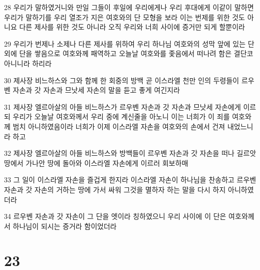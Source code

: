 \par 28 우리가 말하였거니와 만일 그들이 후일에 우리에게나 우리 후대에게 이같이 말하면 우리가 말하기를 우리 열조가 지은 여호와의 단 모형을 보라 이는 번제를 위한 것도 아니요 다른 제사를 위한 것도 아니라 오직 우리와 너희 사이에 증거만 되게 할뿐이라
\par 29 우리가 번제나 소제나 다른 제사를 위하여 우리 하나님 여호와의 성막 앞에 있는 단 외에 단을 쌓음으로 여호와께 패역하고 오늘날 여호와를 좇음에서 떠나려 함은 결단코 아니니라 하리라
\par 30 제사장 비느하스와 그와 함께 한 회중의 방백 곧 이스라엘 천만 인의 두령들이 르우벤 자손과 갓 자손과 므낫세 자손의 말을 듣고 좋게 여긴지라
\par 31 제사장 엘르아살의 아들 비느하스가 르우벤 자손과 갓 자손과 므낫세 자손에게 이르되 우리가 오늘날 여호와께서 우리 중에 계신줄을 아노니 이는 너희가 이 죄를 여호와께 범치 아니하였음이라 너희가 이제 이스라엘 자손을 여호와의 손에서 건져 내었느니라 하고
\par 32 제사장 엘르아살의 아들 비느하스와 방백들이 르우벤 자손과 갓 자손을 떠나 길르앗 땅에서 가나안 땅에 돌아와 이스라엘 자손에게 이르러 회보하매
\par 33 그 일이 이스라엘 자손을 즐겁게 한지라 이스라엘 자손이 하나님을 찬송하고 르우벤 자손과 갓 자손의 거하는 땅에 가서 싸워 그것을 멸하자 하는 말을 다시 하지 아니하였더라
\par 34 르우벤 자손과 갓 자손이 그 단을 엣이라 칭하였으니 우리 사이에 이 단은 여호와께서 하나님이 되시는 증거라 함이었더라

\chapter{23}

